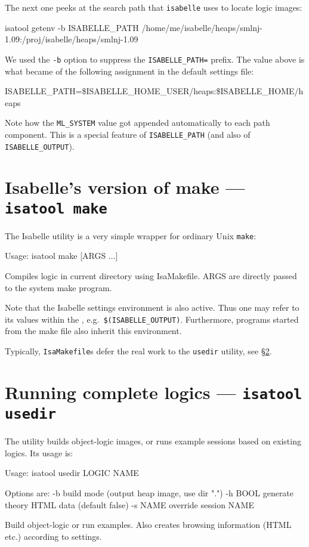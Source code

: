 The next one peeks at the search path that \texttt{isabelle} uses to
locate logic images:
\begin{ttbox}
isatool getenv -b ISABELLE_PATH
{\out /home/me/isabelle/heaps/smlnj-1.09:/proj/isabelle/heaps/smlnj-1.09}
\end{ttbox}
We used the \texttt{-b} option to suppress the \texttt{ISABELLE_PATH=}
prefix.  The value above is what became of the following assignment in
the default settings file:
\begin{ttbox}
ISABELLE_PATH=\$ISABELLE_HOME_USER/heaps:\$ISABELLE_HOME/heaps
\end{ttbox}
Note how the \texttt{ML_SYSTEM} value got appended automatically to
each path component. This is a special feature of
\texttt{ISABELLE_PATH} (and also of \texttt{ISABELLE_OUTPUT}).


\section{Isabelle's version of make --- \texttt{isatool make}}

The Isabelle  utility is a very simple wrapper for
ordinary Unix \texttt{make}:
\begin{ttbox}
Usage: isatool make [ARGS ...]

  Compiles logic in current directory using IsaMakefile.
  ARGS are directly passed to the system make program.
\end{ttbox}
Note that the Isabelle settings environment is also active. Thus one
may refer to its values within the , e.g.\
\texttt{\$(ISABELLE_OUTPUT)}. Furthermore, programs started from the
make file also inherit this environment.

Typically, \texttt{IsaMakefile}s defer the real work to the
\texttt{usedir} utility, see \S\ref{sec:tool-usedir}.



\section{Running complete logics --- \texttt{isatool usedir}} \label{sec:tool-usedir}

The  utility builds object-logic images, or runs
example sessions based on existing logics. Its usage is:
\begin{ttbox}
Usage: isatool usedir LOGIC NAME

  Options are:
    -b           build mode (output heap image, use dir ".")
    -h BOOL      generate theory HTML data (default false)
    -s NAME      override session NAME

  Build object-logic or run examples. Also creates browsing
  information (HTML etc.) according to settings.
\end{ttbox}

